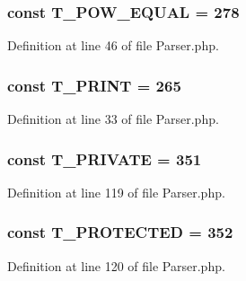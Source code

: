 \subsubsection[{T\+\_\+\+P\+O\+W\+\_\+\+E\+Q\+U\+A\+L}]{\setlength{\rightskip}{0pt plus 5cm}const T\+\_\+\+P\+O\+W\+\_\+\+E\+Q\+U\+A\+L = 278}\label{class_php_parser_1_1_parser_afcbb9d9ed10e1c3a91d499bc7ca43f84}


Definition at line 46 of file Parser.\+php.

\subsubsection[{T\+\_\+\+P\+R\+I\+N\+T}]{\setlength{\rightskip}{0pt plus 5cm}const T\+\_\+\+P\+R\+I\+N\+T = 265}\label{class_php_parser_1_1_parser_afb6f291040be193d7ea73d9ab84c60bd}


Definition at line 33 of file Parser.\+php.

\subsubsection[{T\+\_\+\+P\+R\+I\+V\+A\+T\+E}]{\setlength{\rightskip}{0pt plus 5cm}const T\+\_\+\+P\+R\+I\+V\+A\+T\+E = 351}\label{class_php_parser_1_1_parser_aafe6d13a3893d4042464fe0bc05fdea0}


Definition at line 119 of file Parser.\+php.

\subsubsection[{T\+\_\+\+P\+R\+O\+T\+E\+C\+T\+E\+D}]{\setlength{\rightskip}{0pt plus 5cm}const T\+\_\+\+P\+R\+O\+T\+E\+C\+T\+E\+D = 352}\label{class_php_parser_1_1_parser_ae903d4988f7287db0e6ea2fa081fc667}


Definition at line 120 of file Parser.\+php.

